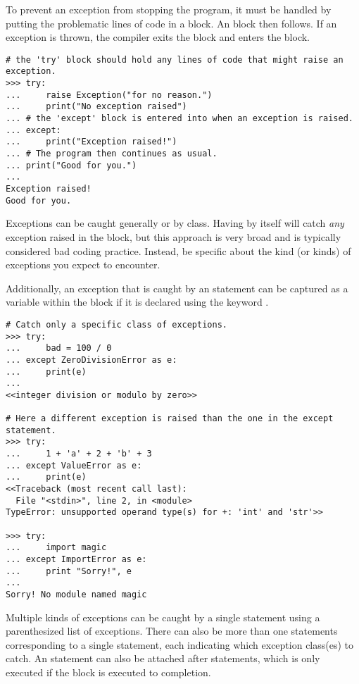 To prevent an exception from stopping the program, it must be handled by
putting the problematic lines of code in a  block.
An  block then follows.
If an exception is thrown, the compiler exits the  block and enters the  block.

\begin{lstlisting}
# the 'try' block should hold any lines of code that might raise an exception.
>>> try:
...     raise Exception("for no reason.")
...     print("No exception raised")
... # the 'except' block is entered into when an exception is raised.
... except:
...     print("Exception raised!")
... # The program then continues as usual.
... print("Good for you.")
... 
Exception raised!
Good for you.
\end{lstlisting}

Exceptions can be caught generally or by class.
Having  by itself will catch \emph{any} exception raised in the  block, but this approach is very broad and is typically considered bad coding practice.
Instead, be specific about the kind (or kinds) of exceptions you expect to encounter.

Additionally, an exception that is caught by an  statement can be captured as a variable within the  block if it is declared using the keyword .

\begin{lstlisting}
# Catch only a specific class of exceptions.
>>> try:
...     bad = 100 / 0
... except ZeroDivisionError as e:
...     print(e)
... 
<<integer division or modulo by zero>>

# Here a different exception is raised than the one in the except statement.
>>> try:
...     1 + 'a' + 2 + 'b' + 3
... except ValueError as e:
...     print(e)
<<Traceback (most recent call last):
  File "<stdin>", line 2, in <module>
TypeError: unsupported operand type(s) for +: 'int' and 'str'>>

>>> try:
...     import magic
... except ImportError as e:
...     print "Sorry!", e
... 
Sorry! No module named magic
\end{lstlisting}

Multiple kinds of exceptions can be caught by a single  statement using a parenthesized list of exceptions.
There can also be more than one  statements corresponding to a single  statement, each indicating which exception class(es) to catch.
An  statement can also be attached after  statements, which is only executed if the  block is executed to completion.

